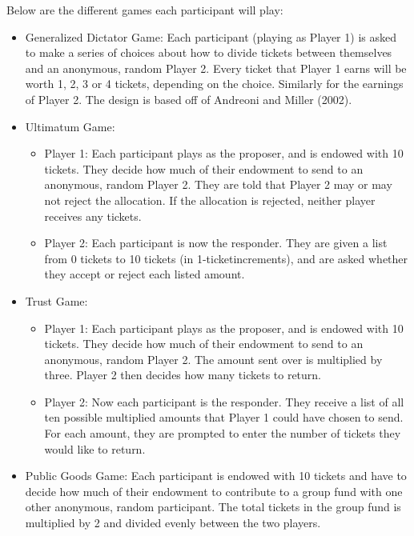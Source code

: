 \documentclass{article}
\begin{document}
Below are the different games each participant will play: 

\begin{itemize}

\item{Generalized Dictator Game}:  Each participant (playing as Player 1) is asked to make a series of choices about how to divide tickets between themselves and an anonymous, random Player 2. Every ticket that Player 1 earns will be worth 1, 2, 3 or 4 tickets, depending on the choice. Similarly for the earnings of Player 2. The design is based off of Andreoni and Miller (2002).
\item{Ultimatum Game}: 
	\begin{itemize}
		\item{Player 1}: Each participant plays as the proposer, and is endowed with 10 tickets. They decide how much of their endowment to send to an anonymous, random Player 2. They are told that Player 2 may or may not reject the allocation. If the allocation is rejected, neither player receives any tickets.
		\item{Player 2}: Each participant is now the responder. They are given a list from 0 tickets to 10 tickets (in 1-ticketincrements), and are asked whether they accept or reject each listed amount.
	\end{itemize}
\item{Trust Game}:
	\begin{itemize}
		\item{Player 1}: Each participant plays as the proposer, and is endowed with 10 tickets. They decide how much of their endowment to send to an anonymous, random Player 2. The amount sent over is multiplied by three. Player 2 then decides how many tickets to return. 
		\item{Player 2}: Now each participant is the responder. They receive a list of all ten possible multiplied amounts that Player 1 could have chosen to send. For each amount, they are prompted to enter the number of tickets they would like to return.
	\end{itemize}
\item{Public Goods Game}: Each participant is endowed with 10 tickets and have to decide how much of their endowment to contribute to a group fund with one other anonymous, random participant. The total tickets in the group fund is multiplied by 2 and divided evenly between the two players.

\end{itemize}
\end{document}
